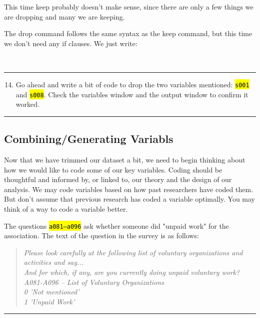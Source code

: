 \documentclass{tufte-handout}
\begin{document}
This time keep probably doesn't make sense, since there are only a few things we are dropping and many we are keeping.

The drop command follows the same syntax as the keep command, but this time we don't need any if clauses. We just write:

\bigskip
{}\\
\bigskip

\bigskip
\hrule
\bigskip

\begin{enumerate}[leftmargin=.5in]
\setcounter{enumi}{13}
	\item Go ahead and write a bit of code to drop the two variables mentioned: {\tt \hl{s001}} and {\tt \hl{s008}}. Check the variables window and the output window to confirm it worked.
\end{enumerate}

\bigskip
\hrule
\bigskip

\subsection{\bf Combining/Generating Variabls}

\medskip
{}
\medskip

Now that we have trimmed our dataset a bit, we need to begin thinking about how we would like to code some of our key variables. Coding should be thoughtful and informed by, or linked to, our theory and the design of our analysis. We  may code variables based on how past researchers have coded them.  But don't assume that previous research has coded a variable optimally.  You may think of a way to code a variable better.

The questions {\tt \hl{a081--a096}} ask whether someone did "unpaid work" for the association. The text of the question in the survey is as follows:

\begin{quote}
{\em
Please look carefully at the following list of voluntary organizations and activities and say...\\
And for which, if any, are you currently doing unpaid voluntary work?\\
A081-A096 -- List of Voluntary Organizations\\
0 'Not mentioned'\\
1 'Unpaid Work'}
\end{quote}

\bigskip
\hrule
\bigskip
\end{document}
